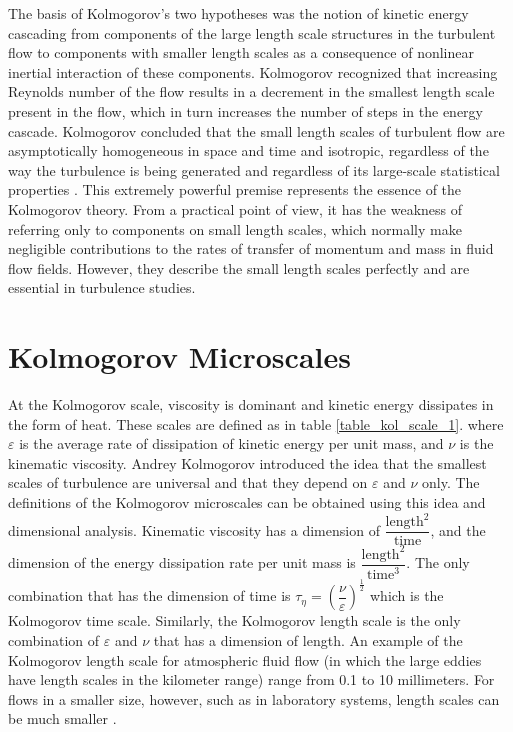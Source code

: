 \documentclass[12pt,oneside,a4paper,english]{article}
\begin{document}
The basis of Kolmogorov's two hypotheses was the notion of kinetic energy cascading from components of the large length scale structures in the turbulent flow to components with smaller length scales as a consequence of nonlinear inertial interaction of these components. Kolmogorov recognized that increasing Reynolds number of the flow results in a decrement in the smallest length scale present in the flow, which in turn increases the number of steps in the energy cascade. Kolmogorov concluded that the small length scales of turbulent flow are asymptotically homogeneous in space and time and isotropic, regardless of the way the turbulence is being generated and regardless of its large-scale statistical properties \cite{pope_2000}. This extremely powerful premise represents the essence of the Kolmogorov theory. From a practical point of view, it has the weakness of referring only to components on small length scales, which normally make negligible contributions to the rates of transfer of momentum and mass in fluid flow fields. However, they describe the small length scales perfectly and are essential in turbulence studies.






\section{Kolmogorov Microscales}
At the Kolmogorov scale, viscosity is dominant and kinetic energy dissipates in the form of heat. These scales are defined as in table \ref{table_kol_scale_1}. where $\varepsilon$ is the average rate of dissipation of kinetic energy per unit mass, and $\nu$ is the kinematic viscosity.
Andrey Kolmogorov introduced the idea that the smallest scales of turbulence are universal and that they depend on $\varepsilon$ and $\nu$ only. The definitions of the Kolmogorov microscales can be obtained using this idea and dimensional analysis. Kinematic viscosity has a dimension of $\dfrac{\text{length}^2}{\text{time}}$, and the dimension of the energy dissipation rate per unit mass is  $\dfrac{\text{length}^2}{\text{time}^3}$. The only combination that has the dimension of time is $\tau_{\eta} = \left(\dfrac{\nu}{\varepsilon}\right)^{\frac{1}{2}}$ which is the Kolmogorov time scale. Similarly, the Kolmogorov length scale is the only combination of $\varepsilon$ and $\nu$ that has a dimension of length. An example of the Kolmogorov length scale for atmospheric fluid flow (in which the large eddies have length scales in the kilometer range) range from 0.1 to 10 millimeters. For flows in a smaller size, however, such as in laboratory systems, length scales can be much smaller \cite{Gibson1929}.
\end{document}
